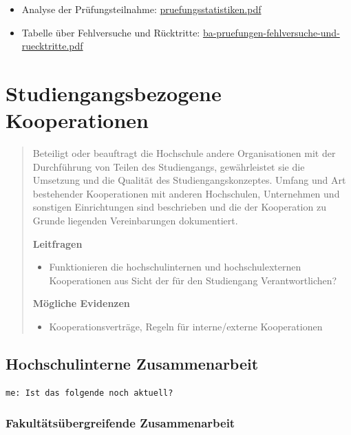 \begin{itemize}
\tightlist
\item
  Analyse der Prüfungsteilnahme:
  \href{../anhaenge/pruefungsplan_mi.pdf}{pruefungsstatistiken.pdf}
\item
  Tabelle über Fehlversuche und Rücktritte:
  \href{../anhaenge/ba-pruefungen-fehlversuche-und-ruecktritte.pdf}{ba-pruefungen-fehlversuche-und-ruecktritte.pdf}
\end{itemize}

\chapter{Studiengangsbezogene
Kooperationen}\label{studiengangsbezogene-kooperationen}

\begin{quote}
Beteiligt oder beauftragt die Hochschule andere Organisationen mit der
Durchführung von Teilen des Studiengangs, gewährleistet sie die
Umsetzung und die Qualität des Studiengangskonzeptes. Umfang und Art
bestehender Kooperationen mit anderen Hochschulen, Unternehmen und
sonstigen Einrichtungen sind beschrieben und die der Kooperation zu
Grunde liegenden Vereinbarungen dokumentiert.

\textbf{Leitfragen}

\begin{itemize}
\tightlist
\item
  Funktionieren die hochschulinternen und hochschulexternen
  Kooperationen aus Sicht der für den Studiengang Verantwortlichen?
\end{itemize}

\textbf{Mögliche Evidenzen}

\begin{itemize}
\tightlist
\item
  Kooperationsverträge, Regeln für interne/externe Kooperationen
\end{itemize}
\end{quote}

\section{Hochschulinterne
Zusammenarbeit}\label{hochschulinterne-zusammenarbeit}

\begin{verbatim}
me: Ist das folgende noch aktuell?
\end{verbatim}

\subsection{Fakultätsübergreifende
Zusammenarbeit}\label{fakultuxe4tsuxfcbergreifende-zusammenarbeit}


